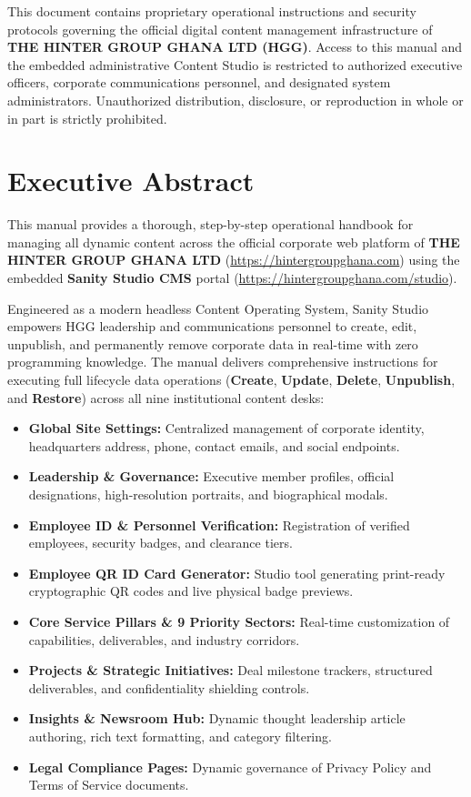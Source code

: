 \documentclass[11pt,a4paper,oneside]{book}
\begin{document}
\begin{navybox}
This document contains proprietary operational instructions and security protocols governing the official digital content management infrastructure of \textbf{THE HINTER GROUP GHANA LTD (HGG)}. Access to this manual and the embedded administrative Content Studio is restricted to authorized executive officers, corporate communications personnel, and designated system administrators. Unauthorized distribution, disclosure, or reproduction in whole or in part is strictly prohibited.
\end{navybox}

\vspace{0.4cm}

\section*{Executive Abstract}
This manual provides a thorough, step-by-step operational handbook for managing all dynamic content across the official corporate web platform of \textbf{THE HINTER GROUP GHANA LTD} (\url{https://hintergroupghana.com}) using the embedded \textbf{Sanity Studio CMS} portal (\url{https://hintergroupghana.com/studio}).

Engineered as a modern headless Content Operating System, Sanity Studio empowers HGG leadership and communications personnel to create, edit, unpublish, and permanently remove corporate data in real-time with zero programming knowledge. The manual delivers comprehensive instructions for executing full lifecycle data operations (\textbf{Create}, \textbf{Update}, \textbf{Delete}, \textbf{Unpublish}, and \textbf{Restore}) across all nine institutional content desks:
\begin{itemize}[leftmargin=1.2cm]
  \item \textbf{Global Site Settings:} Centralized management of corporate identity, headquarters address, phone, contact emails, and social endpoints.
  \item \textbf{Leadership \& Governance:} Executive member profiles, official designations, high-resolution portraits, and biographical modals.
  \item \textbf{Employee ID \& Personnel Verification:} Registration of verified employees, security badges, and clearance tiers.
  \item \textbf{Employee QR ID Card Generator:} Studio tool generating print-ready cryptographic QR codes and live physical badge previews.
  \item \textbf{Core Service Pillars \& 9 Priority Sectors:} Real-time customization of capabilities, deliverables, and industry corridors.
  \item \textbf{Projects \& Strategic Initiatives:} Deal milestone trackers, structured deliverables, and confidentiality shielding controls.
  \item \textbf{Insights \& Newsroom Hub:} Dynamic thought leadership article authoring, rich text formatting, and category filtering.
  \item \textbf{Legal Compliance Pages:} Dynamic governance of Privacy Policy and Terms of Service documents.
\end{itemize}
\end{document}
